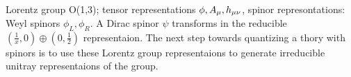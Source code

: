 Lorentz group O(1,3); tensor representations $\phi,A_\mu, h_{\mu\nu}$, spinor
represontations: Weyl spinors $\phi_L, \phi_R$. A Dirac spinor $\psi$
transforms in the reducible $(\frac{1}{x},0)\oplus(0, \frac{1}{2})$
representaion.
The next step towards quantizing a thory with spinors is to use these
Lorentz group representaions to generate irreducible unitray representaions
of the \Poincare{} group.
